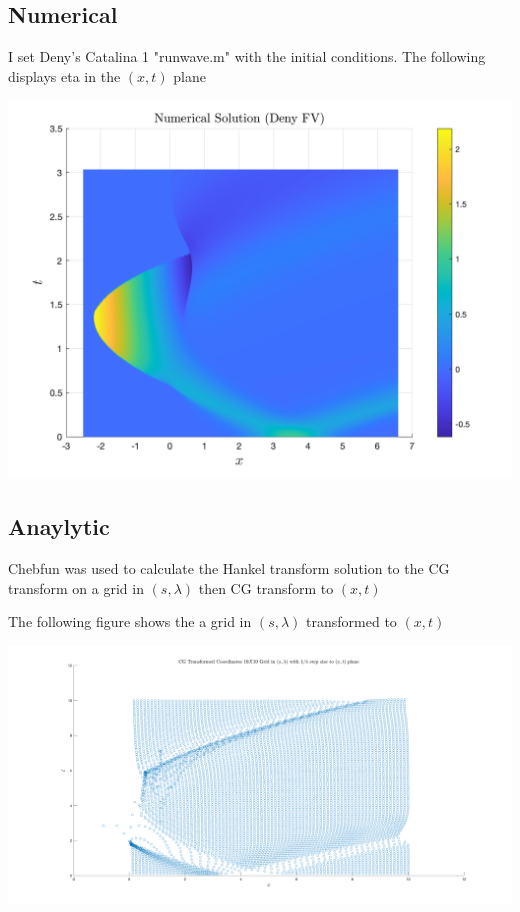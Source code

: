 \documentclass{article}
\begin{document}
\subsection{Numerical}

I set Deny's Catalina 1 "runwave.m" with the initial conditions. The following displays eta in the $(x,t)$ plane

\includegraphics[width=\linewidth]{num.png} 


\subsection{Anaylytic}

Chebfun was used to calculate the Hankel transform solution to the CG transform on a grid in $(s,\lambda)$ then CG transform to $(x,t)$

\noindent The following figure shows the a grid in $(s,\lambda)$ transformed to $(x,t)$

\includegraphics[width=\linewidth]{images/scatter.png} 
\end{document}
